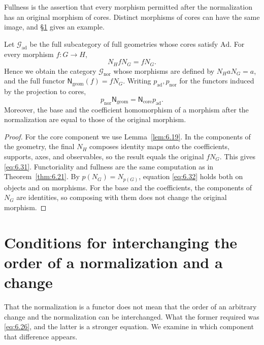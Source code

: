Fullness is the assertion that every morphism permitted after the normalization has an
original morphism of cores.
Distinct morphisms of cores can have the same image, and \S\ref{sec:6.6} gives an example.

\begin{proposition}\label{prop:6.22}

Let $\mathcal{G}_{\mathrm{ad}}$ be the full subcategory of full geometries whose cores
satisfy $\mathrm{Ad}$. For every morphism $f:G\to H$,
\begin{equation*}
N_HfN_G=fN_G.
\tag{6.31}\label{eq:6.31}
\end{equation*}
Hence we obtain the category $\mathcal{G}_{\mathrm{nor}}$ whose morphisms are defined by
$N_HaN_G=a$, and the full functor $\mathsf{N}_{\mathrm{geom}}(f)=fN_G$.
Writing $p_{\mathrm{ad}},p_{\mathrm{nor}}$ for the functors induced by the projection to
cores,
\begin{equation*}
p_{\mathrm{nor}}\mathsf{N}_{\mathrm{geom}}
=\mathsf{N}_{\mathrm{core}}p_{\mathrm{ad}}.
\tag{6.32}\label{eq:6.32}
\end{equation*}
Moreover, the base and the coefficient homomorphism of a morphism after the normalization
are equal to those of the original morphism.

\end{proposition}

\begin{proof}

For the core component we use Lemma~\ref{lem:6.19}.
In the components of the geometry, the final $N_H$ composes identity maps onto the
coefficients, supports, axes, and observables, so the result equals the original $fN_G$.
This gives \eqref{eq:6.31}.
Functoriality and fullness are the same computation as in Theorem~\ref{thm:6.21}.
By $p(N_G)=N_{p(G)}$, equation \eqref{eq:6.32} holds both on objects and on morphisms.
For the base and the coefficients, the components of $N_G$ are identities, so composing
with them does not change the original morphism.

\end{proof}

\section{Conditions for interchanging the order of a normalization and a change}\label{sec:6.6}

That the normalization is a functor does not mean that the order of an arbitrary change and
the normalization can be interchanged.
What the former required was \eqref{eq:6.26}, and the latter is a stronger equation.
We examine in which component that difference appears.

